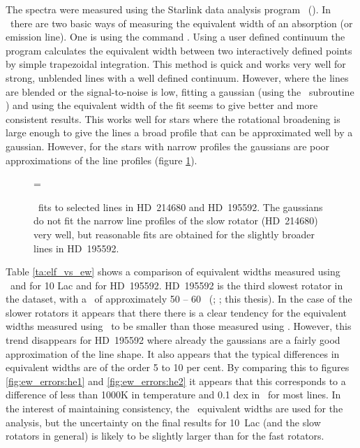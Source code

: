 The spectra were measured using the Starlink data analysis program
\dipso\ (\cite{dipso}). In \dipso\ there are two basic ways of measuring the
equivalent width of an absorption (or emission line). One is using the
command . Using a user defined continuum the program
calculates the equivalent width between two interactively defined
points by simple trapezoidal integration. This method is quick and
works very well for strong, unblended lines with a well defined
continuum. However, where the lines are blended or the signal-to-noise
is low, fitting a gaussian (using the
\dipso\ subroutine \elf) and using the equivalent width of the fit
seems to give better and more consistent results. This works well for
stars where the rotational broadening is large enough to give the
lines a broad profile that can be approximated well by a
gaussian. However, for the stars with narrow profiles the gaussians
are poor approximations of the line profiles (figure
\ref{fig:elf_fits}).

\begin{figure} %

\epsfxsize=\figwidth
\setlength{\cen}{(\textwidth / 2) - (\epsfxsize / 2)}
\hspace{\cen}

\caption[\elf\ fits to selected lines in HD~214680 and HD~195592]
{\fcfont \elf\ fits to selected lines in HD~214680 and HD~195592. The
gaussians do not fit the narrow line profiles of the slow rotator
(HD~214680) very well, but reasonable fits are obtained for the
slightly broader lines in HD~195592.}
\label{fig:elf_fits}
\end{figure} %


Table \ref{ta:elf_vs_ew} shows a comparison of equivalent widths
measured using \elf\ and  for 10 Lac and for
HD~195592. HD~195592 is the third slowest rotator in the dataset,
with a \vsini\ of approximately 50 -- 60 \kms\ (\cite{sl:56};
\cite{co:vii}; this thesis). In the case of the slower rotators it
appears that there there is a clear tendency for
the equivalent widths measured using \elf\ to be smaller than those
measured using
. However, this trend
disappears for HD~195592 where already the gaussians are a fairly good
approximation of the line shape. It also appears that the typical
differences in equivalent widths are of the order 5 to 10 per cent. By
comparing this to figures
\ref{fig:ew_errors:he1} and \ref{fig:ew_errors:he2} it appears that
this corresponds to a difference of less than 1000K in temperature and
0.1 dex in \logg\ for most lines. In the interest of maintaining
consistency, the \elf\ equivalent widths are used for the analysis,
but the uncertainty on the final results for 10~Lac (and the slow
rotators in general) is likely to be slightly larger than for the fast
rotators.

